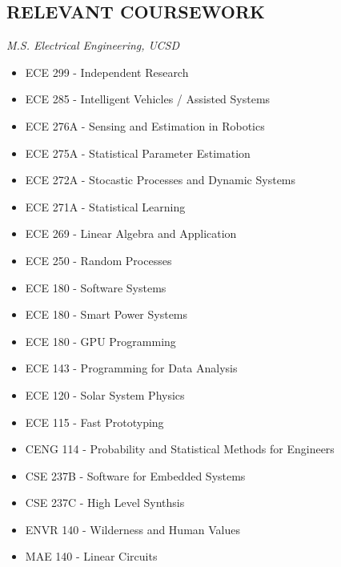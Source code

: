\documentclass[line,margin]{res}
\begin{document}
\begin{resume}
\section{RELEVANT COURSEWORK}
	{\sl M.S. Electrical Engineering, UCSD}
	\begin{itemize}
		\item ECE 299 - Independent Research
		\item ECE 285 - Intelligent Vehicles / Assisted Systems
		\item ECE 276A - Sensing and Estimation in Robotics
		\item ECE 275A - Statistical Parameter Estimation
		\item ECE 272A - Stocastic Processes and Dynamic Systems
		\item ECE 271A - Statistical Learning
		\item ECE 269 - Linear Algebra and Application
		\item ECE 250 - Random Processes
		\item ECE 180 - Software Systems
		\item ECE 180 - Smart Power Systems
		\item ECE 180 - GPU Programming
		\item ECE 143 - Programming for Data Analysis
		\item ECE 120 - Solar System Physics
		\item ECE 115 - Fast Prototyping
		\item CENG 114 - Probability and Statistical Methods for Engineers
		\item CSE 237B - Software for Embedded Systems
		\item CSE 237C - High Level Synthsis
		\item ENVR 140 - Wilderness and Human Values
		\item MAE 140 - Linear Circuits
	\end{itemize}


\end{resume}
\end{document}
